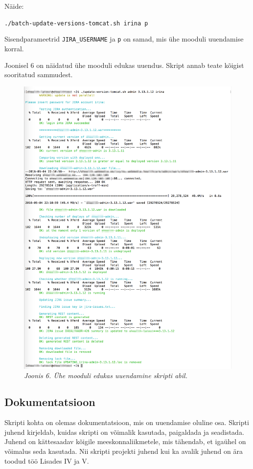 \documentclass[12pt]{article}
\newcommand{\code}[1]{\texttt{#1}}
\begin{document}
  Näide:
  \begin{center}
    \small{\code{./batch-update-versions-tomcat.sh irina p}}
  \end{center}
  
    Sisendparameetrid \code{JIRA\_USERNAME} ja \code{p} on samad, mis ühe mooduli uuendamise korral.
  
  Joonisel 6 on näidatud ühe mooduli edukas uuendus. Skript annab teate kõigist sooritatud sammudest.
  
  \begin{figure}[H]
     \begin{center} 
       \includegraphics[width=.85\textwidth]{screenshots/one-module-successful-update.png}
       \caption*{\textit{Joonis 6. Ühe mooduli edukas uuendamine skripti abil.}}
     \end{center}
  \end{figure}
  
  \subsection{Dokumentatsioon}
  
  Skripti kohta on olemas dokumentatsioon, mis on uuendamise oluline osa. Skripti juhend kirjeldab, kuidas skripti on võimalik kasutada, paigaldada ja seadistada. Juhend on kättesaadav kõigile meeskonnaliikmetele, mis tähendab, et igaühel on võimalus seda kasutada. Nii skripti projekti juhend kui ka avalik juhend on ära toodud töö Lisades IV ja V.
  
\end{document}
